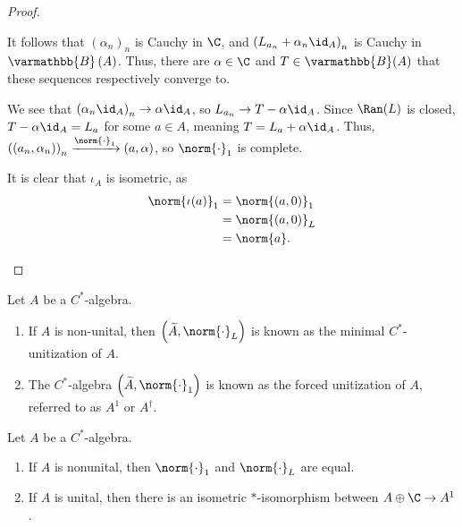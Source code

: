 \documentclass[10pt]{mypackage}
\renewcommand*{\mathbb}[1]{\varmathbb{#1}}
\newcommand{\B}{\mathbb{B}}
\begin{document}
\begin{proof}
\begin{enumerate}[(1)]
      It follows that $\left(\alpha_n\right)_n$ is Cauchy in $\C$, and $\left(L_{a_n} + \alpha_n \id_{A}\right)_n$ is Cauchy in $\B\left(A\right)$. Thus, there are $\alpha\in \C$ and $T\in \B(A)$ that these sequences respectively converge to.\newline

      We see that $\left(\alpha_n\id_{A}\right)_n \rightarrow \alpha\id_A$, so $L_{a_n}\rightarrow T - \alpha \id_A$. Since $\Ran(L)$ is closed, $T - \alpha \id_A = L_a$ for some $a\in A$, meaning $T = L_a + \alpha \id_A$. Thus, $\left(\left(a_n,\alpha_n\right)\right)_n\xrightarrow{\norm{\cdot}_1} \left(a,\alpha\right)$, so $\norm{\cdot}_1$ is complete.\newline

      It is clear that $\iota_A$ is isometric, as
      \begin{align*}
        \norm{\iota(a)}_1 &= \norm{\left(a,0\right)}_1\\
                          &= \norm{\left(a,0\right)}_L\\
                          &= \norm{a}.
      \end{align*}
  \end{enumerate}
\end{proof}
\begin{definition}
  Let $A$ be a $C^{\ast}$-algebra.
  \begin{enumerate}[(1)]
    \item If $A$ is non-unital, then $\left(\widetilde{A},\norm{\cdot}_L\right)$ is known as the minimal $C^{\ast}$-unitization of $A$.
    \item The $C^{\ast}$-algebra $\left(\widetilde{A},\norm{\cdot}_1\right)$ is known as the forced unitization of $A$, referred to as $A^1$ or $A^\dagger$.
  \end{enumerate}
\end{definition}
\begin{proposition}
  Let $A$ be a $C^{\ast}$-algebra.
  \begin{enumerate}[(1)]
    \item If $A$ is nonunital, then $\norm{\cdot}_1$ and $\norm{\cdot}_L$ are equal.
    \item If $A$ is unital, then there is an isometric $\ast$-isomorphism between $A\oplus \C \rightarrow A^1$.
  \end{enumerate}
\end{proposition}
\end{document}
